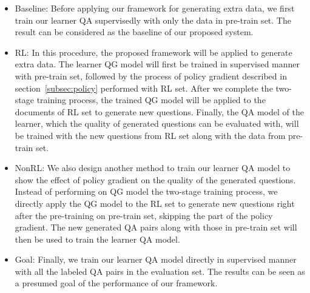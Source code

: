 \documentclass{article}
\begin{document}
\begin{itemize}
    \item Baseline: 
         Before applying our framework for generating extra data, we first train our learner QA supervisedly with only the data in pre-train set. The result can be considered as the baseline of our proposed system.
    \item RL: 
        In this procedure, the proposed framework will be applied to generate extra data. The learner QG model will first be trained in supervised manner with pre-train set, followed by the process of policy gradient described in section~\ref{subsec:policy} performed with RL set. After we complete the two-stage training process, the trained QG model will be applied to the documents of RL set to generate new questions. Finally, the QA model of the learner, which the quality of generated questions can be evaluated with, will be trained with the new questions from RL set along with the data from pre-train set.
    \item NonRL: 
        We also design another method to train our learner QA model to show the effect of policy gradient on the quality of the generated questions. Instead of performing on QG model the two-stage training process, we directly apply the QG model to the RL set to generate new questions right after the pre-training on pre-train set, skipping the part of the policy gradient. The new generated QA pairs along with those in pre-train set will then be used to train the learner QA model.
    \item Goal: 
        Finally, we train our learner QA model directly in supervised manner with all the labeled QA pairs in the evaluation set. The results can be seen as a presumed goal of the performance of our framework.%
\end{itemize}
\end{document}
